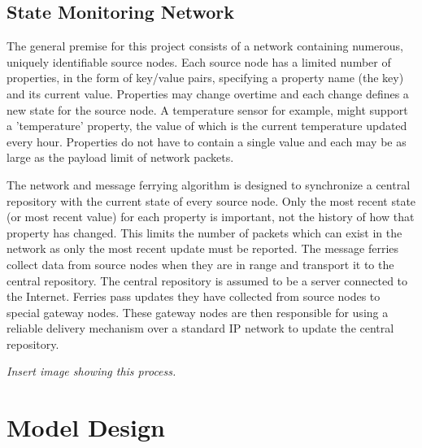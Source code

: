 \subsection{State Monitoring Network}

The general premise for this project consists of a network containing numerous, uniquely identifiable source nodes. 
Each source node has a limited number of properties, in the form of key/value pairs, specifying a property name (the key) and its current value.
Properties may change overtime and each change defines a new state for the source node.
A temperature sensor for example, might support a 'temperature' property, the value of which is the current temperature updated every hour.
Properties do not have to contain a single value and each may be as large as the payload limit of network packets. %

%




The network and message ferrying algorithm is designed to synchronize a central repository with the current state of every source node.
Only the most recent state (or most recent value) for each property is important, not the history of how that property has changed.
This limits the number of packets which can exist in the network as only the most recent update must be reported.
The message ferries collect data from source nodes when they are in range and transport it to the central repository.
The central repository is assumed to be a server connected to the Internet.
Ferries pass updates they have collected from source nodes to special gateway nodes.
These gateway nodes are then responsible for using a reliable delivery mechanism over a standard IP network to update the central repository.

\emph{Insert image showing this process.}

\section{Model Design}
